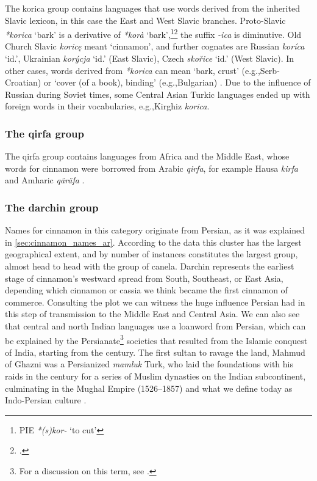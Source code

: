 The korica group contains languages that use words derived from the inherited Slavic lexicon, in this case the East and West Slavic branches. Proto-Slavic \textit{*korica} `bark' is a derivative of \textit{*korà} `bark',\footnote{\gls{PIE} \textit{*(s)kor-} `to cut'}\footcite[]{derksen_etymological_2008} the suffix \textit{-ica} is diminutive. Old Church Slavic \textit{koricę} meant `cinnamon', and further cognates are Russian \textit{koríca} `id.', Ukrainian  \textit{korýcja} `id.' (East Slavic), Czech \textit{skořice} `id.' (West Slavic). In other cases, words derived from \textit{*korica} can mean `bark, crust' (e.g.,Serb-Croatian) or `cover (of a book), binding' (e.g.,Bulgarian) \autocite[235]{derksen_etymological_2008}. Due to the influence of Russian during Soviet times, some Central Asian Turkic languages ended up with foreign words in their vocabularies, e.g.,Kirghiz  \textit{korica}.

\subsubsection{The qirfa group}

The qirfa group contains languages from Africa and the Middle East, whose words for cinnamon were borrowed from Arabic \textit{qirfa}, for example Hausa \textit{kirfa} \autocite[114]{newman_hausa-english_2007} and Amharic  \textit{qäräfa} \autocite[74]{leslau_concise_1996}.

\subsubsection{The darchin group}

Names for cinnamon in this category originate from Persian, as it was explained in \cref{sec:cinnamon_names_ar}. According to the data this cluster has the largest geographical extent, and by number of instances constitutes the largest group, almost head to head with the group of canela. Darchin represents the earliest stage of cinnamon's westward spread from South, Southeast, or East Asia, depending which cinnamon or cassia we think became the first cinnamon of commerce. Consulting the plot we can witness the huge influence Persian had in this step of transmission to the Middle East and Central Asia. We can also see that central and north Indian languages use a loanword from Persian, which can be explained by the Persianate\footnote{For a discussion on this term, see \textcite{green_persianate_2019}.} societies that resulted from the Islamic conquest of India, starting from the  century. The first sultan to ravage the land, Mahmud of Ghazni was a Persianized \textit{mamluk} Turk, who laid the foundations with his raids in the  century for a series of Muslim dynasties on the Indian subcontinent, culminating in the Mughal Empire (1526–1857) and what we define today as Indo-Persian culture \autocite[33]{eaton_india_2019}.

